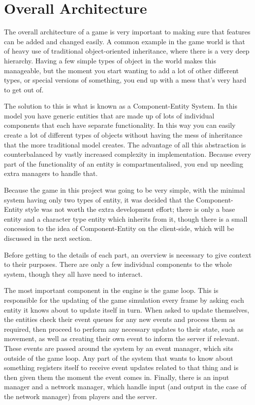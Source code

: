 \section{Overall Architecture}
The overall architecture of a game is very important to making sure that features can be added and changed easily. A common example in the game world is that of heavy use of traditional object-oriented inheritance, where there is a very deep hierarchy. Having a few simple types of object in the world makes this manageable, but the moment you start wanting to add a lot of other different types, or special versions of something, you end up with a mess that's very hard to get out of.

The solution to this is what is known as a Component-Entity System. In this model you have generic entities that are made up of lots of individual components that each have separate functionality. In this way you can easily create a lot of different types of objects without having the mess of inheritance that the more traditional model creates. The advantage of all this abstraction is counterbalanced by vastly increased complexity in implementation. Because every part of the functionality of an entity is compartmentalised, you end up needing extra managers to handle that.

Because the game in this project was going to be very simple, with the minimal system having only two types of entity, it was decided that the Component-Entity style was not worth the extra development effort; there is only a base entity and a character type entity which inherits from it, though there is a small concession to the idea of Component-Entity on the client-side, which will be discussed in the next section.

Before getting to the details of each part, an overview is necessary to give context to their purposes. There are only a few individual components to the whole system, though they all have need to interact.

The most important component in the engine is the game loop. This is responsible for the updating of the game simulation every frame by asking each entity it knows about to update itself in turn. When asked to update themselves, the entities check their event queues for any new events and process them as required, then proceed to perform any necessary updates to their state, such as movement, as well as creating their own event to inform the server if relevant. These events are passed around the system by an event manager, which sits outside of the game loop. Any part of the system that wants to know about something registers itself to receive event updates related to that thing and is then given them the moment the event comes in. Finally, there is an input manager and a network manager, which handle input (and output in the case of the network manager) from players and the server.

